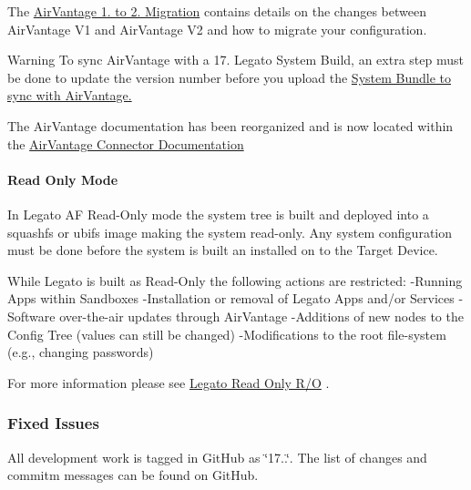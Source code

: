 The \hyperlink{avMigration}{Air\+Vantage 1. to 2. Migration} contains details on the changes between Air\+Vantage V1 and Air\+Vantage V2 and how to migrate your configuration.

\begin{DoxyWarning}{Warning}
To sync Air\+Vantage with a 17. Legato System Build, an extra step must be done to update the version number before you upload the \hyperlink{avInstallUpload_avInstallUpload_CustomSystem}{System Bundle to sync with Air\+Vantage.}
\end{DoxyWarning}
The Air\+Vantage documentation has been reorganized and is now located within the \hyperlink{legatoServicesAirVantage}{Air\+Vantage Connector Documentation}\hypertarget{releaseNotes17050_rn17_05_FeaturesExperimentalReadOnly}{}\paragraph{Read Only Mode}\label{releaseNotes17050_rn17_05_FeaturesExperimentalReadOnly}
In Legato AF Read-\/\+Only mode the system tree is built and deployed into a squashfs or ubifs image making the system read-\/only. Any system configuration must be done before the system is built an installed on to the Target Device.

While Legato is built as Read-\/\+Only the following actions are restricted\+: -\/\+Running Apps within Sandboxes -\/\+Installation or removal of Legato Apps and/or Services -\/\+Software over-\/the-\/air updates through Air\+Vantage -\/\+Additions of new nodes to the Config Tree (values can still be changed) -\/\+Modifications to the root file-\/system (e.\+g., changing passwords)

For more information please see \hyperlink{platformConstraintsReadOnly}{Legato Read Only R/O} .\hypertarget{releaseNotes17050_rn17_05_Fixes}{}\subsubsection{Fixed Issues}\label{releaseNotes17050_rn17_05_Fixes}
All development work is tagged in Git\+Hub as \char`\"{}17..\char`\"{}. The list of changes and commitm messages can be found on Git\+Hub.

